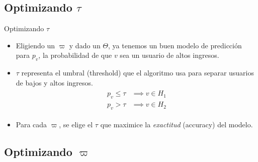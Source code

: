 \documentclass[usenames,dvipsnames,table]{beamer}
\begin{document}
\subsection{Optimizando $\tau$}

\begin{frame}{Optimizando $\tau$}
	\begin{itemize}
		\item Eligiendo un $\varpi$ y dado un $\Theta$, ya tenemos un buen modelo de predicción para $p_v$, la probabilidad de que $v$ sea un usuario de altos ingresos.
		\item $\tau$ representa el umbral (threshold) que el algoritmo usa para separar usuarios de bajos y altos ingresos.
			\begin{gather*}
				\begin{aligned}
					p_v \leq \tau &\implies v \in H_1 \\
					p_v >    \tau &\implies v \in H_2
				\end{aligned}
			\end{gather*}
		\item Para cada $\varpi$, se elige el $\tau$ que maximice la \emph{exactitud} (accuracy) del modelo.
	\end{itemize}
\end{frame}

\subsection{Optimizando $\varpi$}
\end{document}
